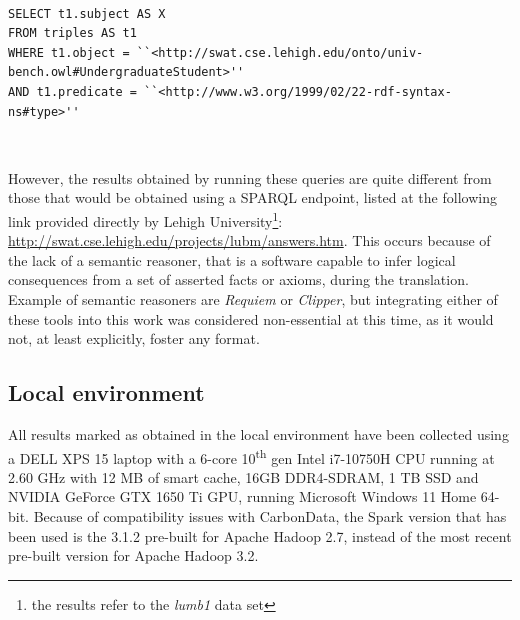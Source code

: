 \documentclass[10pt, a4paper]{report}
\begin{document}
\begin{enumerate}
\begin{minipage}{0.92\textwidth}
\begin{lstlisting}
                        \end{lstlisting}
	\end{minipage} \\
	\begin{minipage}{0.92\textwidth}
		\item \label{query:lumb_sql_14}
		\lstset{language=sql}
		\begin{lstlisting}
SELECT t1.subject AS X
FROM triples AS t1
WHERE t1.object = ``<http://swat.cse.lehigh.edu/onto/univ-bench.owl#UndergraduateStudent>''
AND t1.predicate = ``<http://www.w3.org/1999/02/22-rdf-syntax-ns#type>''
                        \end{lstlisting}
	\end{minipage} \\
\end{enumerate}

However, the results obtained by running these queries are quite different from those that would be obtained using a SPARQL endpoint, listed at the following link provided directly by Lehigh University\footnote{the results refer to the \textit{lumb1} data set}: \href{http://swat.cse.lehigh.edu/projects/lubm/answers.htm}{http://swat.cse.lehigh.edu/projects/lubm/answers.htm}. This occurs because of the lack of a semantic reasoner, that is a software capable to infer logical consequences from a set of asserted facts or axioms, during the translation. Example of semantic reasoners are \textit{Requiem}\cite{requiem} or \textit{Clipper}\cite{clipper}, but integrating either of these tools into this work was considered non-essential at this time, as it would not, at least explicitly, foster any format.

\subsection{Local environment}

\label{subsection:local_environment}

All results marked as obtained in the local environment have been collected using a DELL XPS 15 laptop with a 6-core 10\textsuperscript{th} gen Intel i7-10750H CPU running at 2.60 GHz with 12 MB of smart cache, 16GB DDR4-SDRAM, 1 TB SSD and NVIDIA GeForce GTX 1650 Ti GPU, running Microsoft Windows 11 Home 64-bit. Because of compatibility issues with CarbonData, the Spark version that has been used is the 3.1.2 pre-built for Apache Hadoop 2.7, instead of the most recent pre-built version for Apache Hadoop 3.2.
\end{document}
